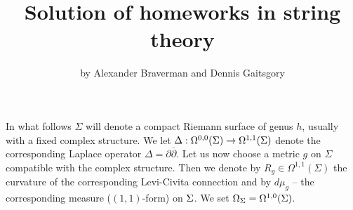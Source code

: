 \newcommand\tilalp{{\widetilde{\alpha}}}
\newcommand\tilbet{{\widetilde{\beta}}}
\newcommand\tildel{{\widetilde{\delta}}}
\newcommand\tilDel{{\widetilde{\Delta}}}
\newcommand\tilchi{{\widetilde{\chi}}}
\newcommand\tileta{{\widetilde{\eta}}}
\newcommand\tilgam{{\widetilde{\gamma}}}
\newcommand\tilGam{{\widetilde{\Gamma}}}
\newcommand\tilome{{\widetilde{\ome}}}
\newcommand\tillam{{\widetilde{\lam}}}
\newcommand\tilmu{{\widetilde{\mu}}}
\newcommand\tilphi{{\widetilde{\phi}}}
\newcommand\tilpi{{\widetilde{\pi}}}
\newcommand\tilpsi{{\widetilde{\psi}}}
\renewcommand\tilome{{\widetilde{\ome}}}
\newcommand\tilOme{{\widetilde{\Ome}}}
\newcommand\tilPhi{{\widetilde{\Phi}}}
\newcommand\tilQQ{{\widetilde{\QQ}}}
\newcommand\tilrho{{\widetilde{\rho}}}
\newcommand\tilsig{{\widetilde{\sig}}}
\newcommand\tiltau{{\widetilde{\tau}}}
\newcommand\tiltet{{\widetilde{\theta}}}
\newcommand\tilvarphi{{\widetilde{\varphi}}}
\newcommand\tilxi{{\widetilde{\xi}}}


\newcommand\twolongrightarrow{\ \hbox{$\longrightarrow\hskip -17pt
\longrightarrow$}\ }
 
 
\renewcommand\+{\oplus }
\newcommand\x{\times }
\newcommand\ten{\otimes}
\newcommand\opd{\oplus\cdots\oplus}
\newcommand\oxd{\otimes\cdots\otimes}
\renewcommand\pd{+\cdots +}
\newcommand\dm{-\cdots -}
\newcommand\dx{\cdot\dots\cdot}

\renewcommand{\>}{\rangle}
\newcommand{\<}{\langle}


\newcommand\loc{\calL oc}
\newcommand\la{\langle}
\newcommand\ra{\rangle}






\renewcommand\d{\partial}
\newcommand\Lie{\text{Lie}}
\newcommand\boxx{\boxtimes}

\title[]{
Solution of homeworks in string theory}

\author[]{by Alexander Braverman and Dennis Gaitsgory}

\maketitle


In what follows $\Sigma$ will denote a compact Riemann surface of genus $h$,
usually with a fixed complex structure. We let $\Delta:\Omega^{0,0}(\Sigma)\to
\Omega^{1,1}(\Sigma)$ denote the corresponding Laplace operator $\Delta=
\d{\overline\d}$. Let us now choose a metric $g$ on $\Sigma$ compatible 
with the complex structure. Then we denote by $R_g\in \Omega^{1,1}(\Sigma)$
the curvature of the corresponding Levi-Civita connection and by
$d\mu_g$ -- the corresponding measure ($(1,1)$-form) on $\Sigma$. We set 
$\Omega_{\Sigma}=\Omega^{1,0}(\Sigma)$.

